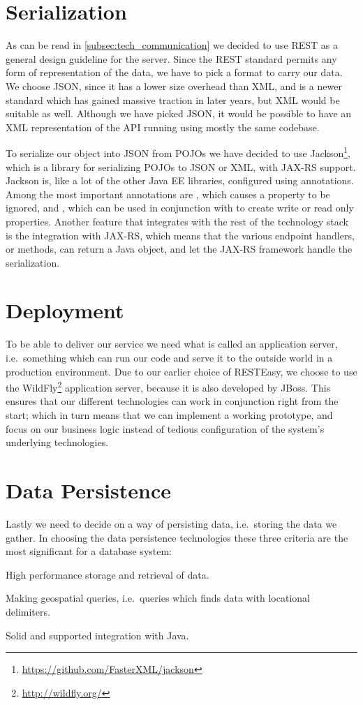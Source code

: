 \section{Serialization}\label{subsec:serialization_tech}
As can be read in \cref{subsec:tech_communication} we decided to use REST as a general design guideline for the server.
Since the REST standard permits any form of representation of the data, we have to pick a format to carry our data.
We choose JSON, since it has a lower size overhead than XML, and is a newer standard which has gained massive traction in later years, but XML would be suitable as well.
Although we have picked JSON, it would be possible to have an XML representation of the API running using mostly the same codebase.

To serialize our object into JSON from \acp{POJO} we have decided to use Jackson\footnote{\url{https://github.com/FasterXML/jackson}}, which is a library for serializing \acp{POJO} to JSON or XML, with JAX-RS support.
Jackson is, like a lot of the other \ac{Java EE} libraries, configured using annotations.
Among the most important annotations are , which causes a property to be ignored, and , which can be used in conjunction with  to create write or read only properties.
Another feature that integrates with the rest of the technology stack is the integration with JAX-RS, which means that the various endpoint handlers, or methods, can return a Java object, and let the JAX-RS framework handle the serialization.

\section{Deployment}
To be able to deliver our service we need what is called an application server, i.e.~something which can run our code and serve it to the outside world in a production environment.
Due to our earlier choice of RESTEasy, we choose to use the WildFly\footnote{\url{http://wildfly.org/}} application server, because it is also developed by JBoss.
This ensures that our different technologies can work in conjunction right from the start;
which in turn means that we can implement a working prototype, and focus on our business logic instead of tedious configuration of the system's underlying technologies.

\section{Data Persistence}\label{subsec:datapersistence}
Lastly we need to decide on a way of persisting data, i.e.~storing the data we gather.
In choosing the data persistence technologies these three criteria are the most significant for a database system:
\begin{eletterate}
    \item High performance storage and retrieval of data.
    \item Making geospatial queries, i.e.~queries which finds data with locational delimiters.
    \item Solid and supported integration with Java.
\end{eletterate}


